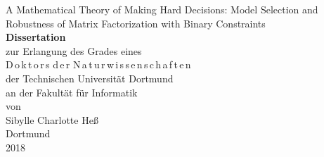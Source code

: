 \begin{titlepage}
\sffamily
\hspace*{-0.2cm}
\huge
\begin{center}
{ A Mathematical Theory of Making Hard Decisions:
Model Selection and Robustness of Matrix Factorization with Binary
Constraints} \\
\vspace*{2cm}
\textbf{Dissertation} \\
\vspace*{1cm}
zur Erlangung des Grades eines\\
\vspace*{1cm}
{D\,o\,k\,t\,o\,r\,s\hspace{0.3cm} d\,e\,r\hspace{0.3cm} N\,a\,t\,u\,r\,w\,i\,s\,s\,e\,n\,s\,c\,h\,a\,f\,t\,e\,n}\\
\vspace*{1cm}
der Technischen Universit\"at Dortmund\\
an der Fakult\"at f\"ur Informatik
\\
\vspace*{1cm}
von\\
\vspace*{1cm}
Sibylle Charlotte He\ss \\
\vspace*{2cm}
Dortmund\\
2018\\
\vspace*{10cm}
\end{center}
\end{titlepage}